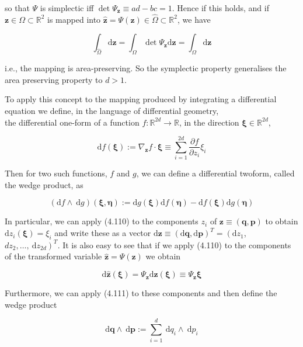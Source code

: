 \documentclass[10pt]{article}
\begin{document}
so that \(\Psi\) is simplectic iff \(\operatorname{det} \Psi_{\mathbf{z}} \equiv a d-b c=1\). Hence if this holds, and if \(\mathbf{z} \in \Omega \subset \mathbb{R}^{2}\) is mapped into \(\hat{\mathbf{z}}=\Psi(\mathbf{z}) \in \hat{\Omega} \subset \mathbb{R}^{2}\), we have

\[
\int_{\hat{\Omega}} \mathrm{d} \hat{\mathbf{z}}=\int_{\Omega} \operatorname{det} \Psi_{\mathbf{z}} \mathrm{d} \mathbf{z}=\int_{\Omega} \mathrm{d} \mathbf{z}
\]

i.e., the mapping is area-preserving. So the symplectic property generalises the area preserving property to \(d>1\).

To apply this concept to the mapping produced by integrating a differential equation we define, in the language of differential geometry,\\
the differential one-form of a function \(f: \mathbb{R}^{2 d} \rightarrow \mathbb{R}\), in the direction \(\boldsymbol{\xi} \in \mathbb{R}^{2 d}\),

\[
\mathrm{d} f(\boldsymbol{\xi}):=\nabla_{\mathbf{z}} f \cdot \boldsymbol{\xi} \equiv \sum_{i=1}^{2 d} \frac{\partial f}{\partial z_{i}} \xi_{i}
\]

Then for two such functions, \(f\) and \(g\), we can define a differential twoform, called the wedge product, as

\[
(\mathrm{d} f \wedge \mathrm{~d} g)(\boldsymbol{\xi}, \boldsymbol{\eta}):=\mathrm{d} g(\boldsymbol{\xi}) \mathrm{d} f(\boldsymbol{\eta})-\mathrm{d} f(\boldsymbol{\xi}) \mathrm{d} g(\boldsymbol{\eta})
\]

In particular, we can apply (4.110) to the components \(z_{i}\) of \(\mathbf{z} \equiv(\mathbf{q}, \mathbf{p})\) to obtain \(\mathrm{d} z_{i}(\boldsymbol{\xi})=\xi_{i}\) and write these as a vector \(\mathrm{d} \mathbf{z} \equiv(\mathrm{d} \mathbf{q}, \mathrm{d} \mathbf{p})^{T}=\left(\mathrm{d} z_{1}\right.\), \(\left.d z_{2}, \ldots, \mathrm{~d} z_{2 d}\right)^{T}\). It is also easy to see that if we apply (4.110) to the components of the transformed variable \(\hat{\mathbf{z}}=\Psi(\mathbf{z})\) we obtain

\[
\mathrm{d} \hat{\mathbf{z}}(\boldsymbol{\xi})=\Psi_{\mathbf{z}} \mathrm{d} \mathbf{z}(\boldsymbol{\xi}) \equiv \Psi_{\mathbf{z}} \boldsymbol{\xi}
\]

Furthermore, we can apply (4.111) to these components and then define the wedge product

\[
\mathrm{d} \mathbf{q} \wedge \mathrm{~d} \mathbf{p}:=\sum_{i=1}^{d} \mathrm{~d} q_{i} \wedge \mathrm{~d} p_{i}
\]
\end{document}
